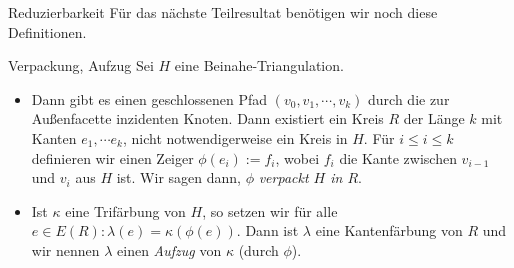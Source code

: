 \begin{section}{Reduzierbarkeit}
 Für das nächste Teilresultat benötigen wir noch diese Definitionen.
 
 \begin{definition}{Verpackung, Aufzug}
  Sei $H$ eine Beinahe-Triangulation. 
  \begin{itemize}
   \item Dann gibt es einen geschlossenen Pfad $(v_0,v_1,\cdots,v_k)$ durch die zur Außenfacette inzidenten Knoten. Dann existiert ein Kreis $R$ der Länge $k$ mit Kanten $e_1,\cdots e_k$, nicht notwendigerweise ein Kreis in $H$. Für $i \leq i \leq k$ definieren wir einen Zeiger $\phi(e_i) := f_i$, wobei $f_i$ die Kante zwischen $v_{i-1}$ und $v_i$ aus $H$ ist. Wir sagen dann, $\phi$ \textit{verpackt $H$ in $R$}. 
   \item Ist $\kappa$ eine Trifärbung von $H$, so setzen wir für alle $e \in E(R): \lambda(e) = \kappa(\phi(e))$. Dann ist $\lambda$ eine Kantenfärbung von $R$ und wir nennen $\lambda$ einen \textit{Aufzug} von $\kappa$ (durch $\phi$).
  \end{itemize}
 \end{definition}
 

\end{section}
